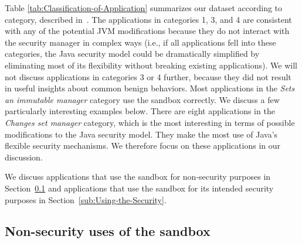 \documentclass{sig-alternate}
\begin{document}
% 
Table \ref{tab:Classification-of-Application} summarizes our dataset according to category, described
in~. The applications in categories 1, 3, and 4 
are consistent with any of the potential JVM
modifications because they do not interact with the
security manager in complex ways (i.e., if all applications fell into these
categories, the Java security model could be dramatically simplified by
eliminating most of its flexibility without breaking existing
applications).   We will
not discuss applications in categories 3 or 4 further, because they did not
result in useful insights about common benign 
behaviors. Most applications in the \emph{Sets an immutable
  manager} category use the sandbox correctly.  We discuss a few particularly interesting examples below. 
%
There are eight applications in the \emph{Changes set manager} category, which
is the most interesting in terms of possible modifications to the Java security
model.  
They make the most use of Java's flexible security
mechanisms.  We therefore focus   
on these applications in our discussion. 

We discuss applications that use the sandbox for
non-security purposes in Section~\ref{sub:Non-security-uses-of}
and applications that use the sandbox for its intended security purposes in
Section~\ref{sub:Using-the-Security}.

\subsection{Non-security uses of the sandbox}\label{sub:Non-security-uses-of}
\end{document}
